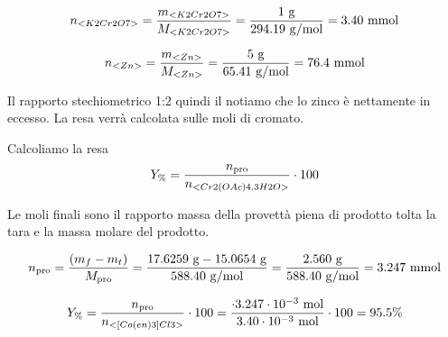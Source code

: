 \[   n_{<K2Cr2O7>} = \frac{m_{<K2Cr2O7>}}{M_{<K2Cr2O7>}} = \frac{1 \mathrm{\ g}}{294.19 \mathrm{\ g/mol}} = 3.40 \mathrm{\ mmol}\]

\[   n_{<Zn>} = \frac{m_{<Zn>}}{M_{<Zn>}} = \frac{5 \mathrm{\ g}}{65.41 \mathrm{\ g/mol}} = 76.4 \mathrm{\ mmol}\]


Il rapporto stechiometrico 1:2  quindi il notiamo che lo zinco è nettamente in eccesso. La resa verrà calcolata sulle moli di cromato.


Calcoliamo la resa 
\[ Y_\% = \frac{n_\text{pro}}{n_{<Cr2(OAc)4.3H2O>}}\cdot 100 \]

Le moli finali sono il rapporto massa della provettà piena di prodotto tolta la tara e la massa molare del prodotto.

\[ n_\text{pro} = \frac{(m_{f} - m_{t})}{M_\text{pro}} 
 = \frac{ 17.6259 \mathrm{\ g} - 15.0654 \mathrm{\ g} }{ 588.40 \mathrm{\ g/mol}} =  \frac{2.560 \mathrm{~g}}{588.40 \mathrm{~g} / \mathrm{mol}}=3.247 \mathrm{\ mmol}\]

\[ Y_\% = \frac{n_\text{pro}}{n_{<[Co(en)3]Cl3>}}\cdot 100  = \frac{ \cdot 3.247 \cdot 10^{-3} \mathrm{~mol}}{3.40 \cdot 10^{-3} \mathrm{~mol}} \cdot 100 =95.5\%\]

